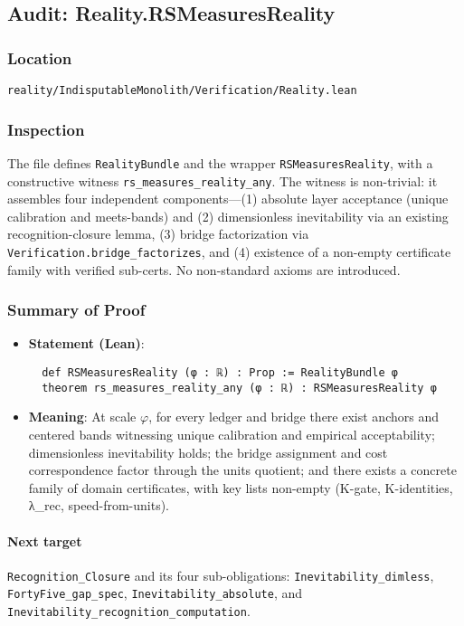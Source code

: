 \documentclass{article}
\newcommand{\FileRef}[1]{\texttt{#1}}
\begin{document}
\subsection{Audit: Reality.RSMeasuresReality}
\subsubsection{Location}
\FileRef{reality/IndisputableMonolith/Verification/Reality.lean}

\subsubsection{Inspection}
The file defines \texttt{RealityBundle} and the wrapper \texttt{RSMeasuresReality}, with a constructive witness \texttt{rs\_measures\_reality\_any}. The witness is non-trivial: it assembles four independent components—(1) absolute layer acceptance (unique calibration and meets-bands) and (2) dimensionless inevitability via an existing recognition-closure lemma, (3) bridge factorization via \texttt{Verification.bridge\_factorizes}, and (4) existence of a non-empty certificate family with verified sub-certs. No non-standard axioms are introduced.

\subsubsection{Summary of Proof}
\begin{itemize}[leftmargin=*]
  \item \textbf{Statement (Lean)}:
  \begin{lstlisting}
  def RSMeasuresReality (φ : ℝ) : Prop := RealityBundle φ
  theorem rs_measures_reality_any (φ : ℝ) : RSMeasuresReality φ
  \end{lstlisting}
  \item \textbf{Meaning}: At scale \(\varphi\), for every ledger and bridge there exist anchors and centered bands witnessing unique calibration and empirical acceptability; dimensionless inevitability holds; the bridge assignment and cost correspondence factor through the units quotient; and there exists a concrete family of domain certificates, with key lists non-empty (K-gate, K-identities, λ\_rec, speed-from-units).
\end{itemize}

\paragraph{Next target} \texttt{Recognition\_Closure} and its four sub-obligations: \texttt{Inevitability\_dimless}, \texttt{FortyFive\_gap\_spec}, \texttt{Inevitability\_absolute}, and \texttt{Inevitability\_recognition\_computation}.
\end{document}
